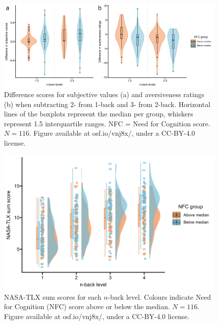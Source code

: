 \documentclass[
  man,floatsintext]{apa6}
\begin{document}
\begin{figure}[H]
\includegraphics[width=\textwidth]{Figures/h3ac-plot} \caption{Difference scores for subjective values (a) and aversiveness ratings (b) when subtracting 2- from 1-back and 3- from 2-back. Horizontal lines of the boxplots represent the median per group, whiskers represent 1.5 interquartile ranges. NFC = Need for Cognition score. $N=116$. Figure available at osf.io/vnj8x/, under a CC-BY-4.0 license.}\label{fig:h3ac-plot}
\end{figure}

\begin{figure}[H]
\includegraphics[width=\textwidth]{Figures/h3b-plot} \caption{NASA-TLX sum scores for each $n$-back level. Colours indicate Need for Cognition (NFC) score above or below the median. $N=116$. Figure available at osf.io/vnj8x/, under a CC-BY-4.0 license.}\label{fig:h3b-plot}
\end{figure}
\end{document}

